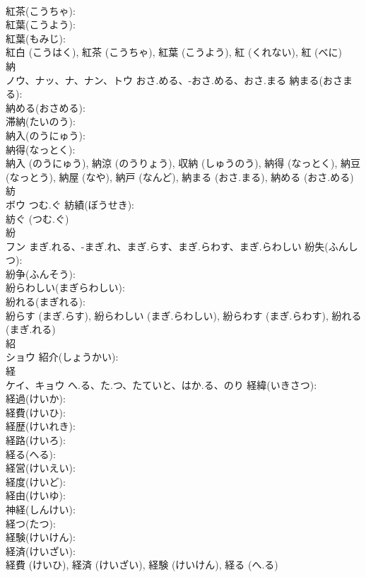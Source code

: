 \documentclass[8pt]{extreport}
\begin{document}
\begin{CJK}{UTF8}{min}
\\	紅茶(こうちゃ): 
\\	紅葉(こうよう): 
\\	紅葉(もみじ): 
\\	紅白 (こうはく), 紅茶 (こうちゃ), 紅葉 (こうよう), 紅 (くれない), 紅 (べに)
\\	納			
\\	ノウ、ナッ、ナ、ナン、トウ	おさ.める、-おさ.める、おさ.まる	納まる(おさまる): 
\\	納める(おさめる): 
\\	滞納(たいのう): 
\\	納入(のうにゅう): 
\\	納得(なっとく): 
\\	納入 (のうにゅう), 納涼 (のうりょう), 収納 (しゅうのう), 納得 (なっとく), 納豆 (なっとう), 納屋 (なや), 納戸 (なんど), 納まる (おさ.まる), 納める (おさ.める)
\\	紡			
\\	ボウ	つむ.ぐ	紡績(ぼうせき): 
\\	紡ぐ (つむ.ぐ)
\\	紛			
\\	フン	まぎ.れる、-まぎ.れ、まぎ.らす、まぎ.らわす、まぎ.らわしい	紛失(ふんしつ): 
\\	紛争(ふんそう): 
\\	紛らわしい(まぎらわしい): 
\\	紛れる(まぎれる): 
\\	紛らす (まぎ.らす), 紛らわしい (まぎ.らわしい), 紛らわす (まぎ.らわす), 紛れる (まぎ.れる)
\\	紹			
\\	ショウ		紹介(しょうかい): 
\\	経			
\\	ケイ、キョウ	へ.る、た.つ、たていと、はか.る、のり	経緯(いきさつ): 
\\	経過(けいか): 
\\	経費(けいひ): 
\\	経歴(けいれき): 
\\	経路(けいろ): 
\\	経る(へる): 
\\	経営(けいえい): 
\\	経度(けいど): 
\\	経由(けいゆ): 
\\	神経(しんけい): 
\\	経つ(たつ): 
\\	経験(けいけん): 
\\	経済(けいざい): 
\\	経費 (けいひ), 経済 (けいざい), 経験 (けいけん), 経る (へ.る)

\end{CJK}
\end{document}
